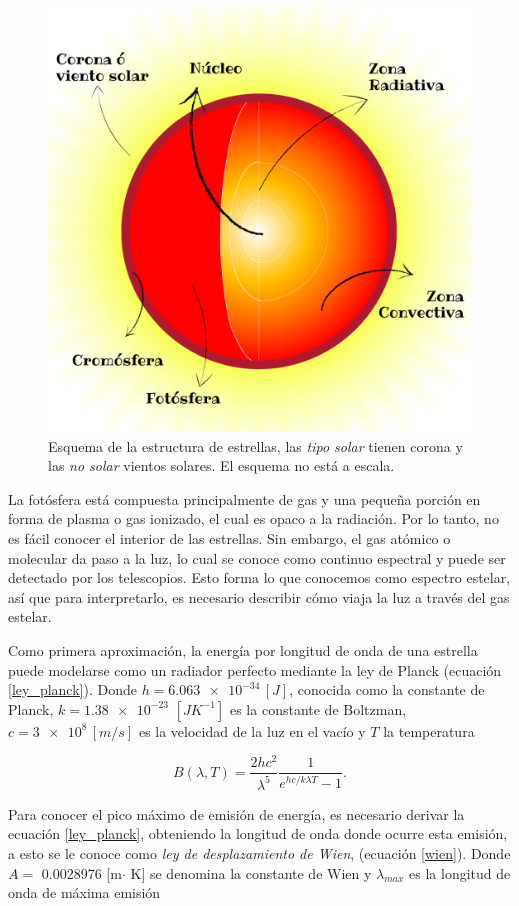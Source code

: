 \documentclass[12pt,oneside,openany,letter]{book}
\begin{document}
\begin{figure}[h]
    \centering
    \includegraphics[width=0.7\linewidth]{Images/estructura_sol.png}
    \caption{Esquema de la estructura de estrellas, las \textit{tipo solar} tienen corona y las \textit{no solar} vientos solares. El esquema no está a escala.}
    \label{fig:estruct_est}
\end{figure}

\noindent La fotósfera está compuesta principalmente de gas y una pequeña porción en forma de plasma o gas ionizado, el cual es opaco a la radiación. Por lo tanto, no es fácil conocer el interior de las estrellas. Sin embargo, el gas atómico o molecular da paso a la luz, lo cual se conoce como continuo espectral y puede ser detectado por los telescopios. Esto forma lo que conocemos como espectro estelar, así que para interpretarlo, es necesario describir cómo viaja la luz a través del gas estelar.

\noindent Como primera aproximación, la energía por longitud de onda de una estrella puede modelarse como un radiador perfecto mediante la ley de Planck (ecuación \ref{ley_planck}). Donde $h = \num{6,063e-34}\,[J]$, conocida como la constante de Planck, $k = \num{1,38e-23}$ $[JK^{-1}]$ es la constante de Boltzman, $c= \num{3e8}\,[m/s]$ es la velocidad de la luz en el vacío y $T$ la temperatura

\begin{equation}
    B(\lambda,T) = \frac{2h c^2}{\lambda^5} \frac{1}{e^{h c/k\lambda T}-1}.
    \label{ley_planck}
\end{equation}

\noindent Para conocer el pico máximo de emisión de energía, es necesario derivar la ecuación \ref{ley_planck}, obteniendo la longitud de onda donde ocurre esta emisión, a esto se le conoce como \textit{ley de desplazamiento de Wien}, (ecuación \ref{wien}). Donde $A = $ 0.0028976 [m$\cdot$ K] se denomina la constante de Wien y $\lambda_{max}$ es la longitud de onda de máxima emisión
\end{document}
